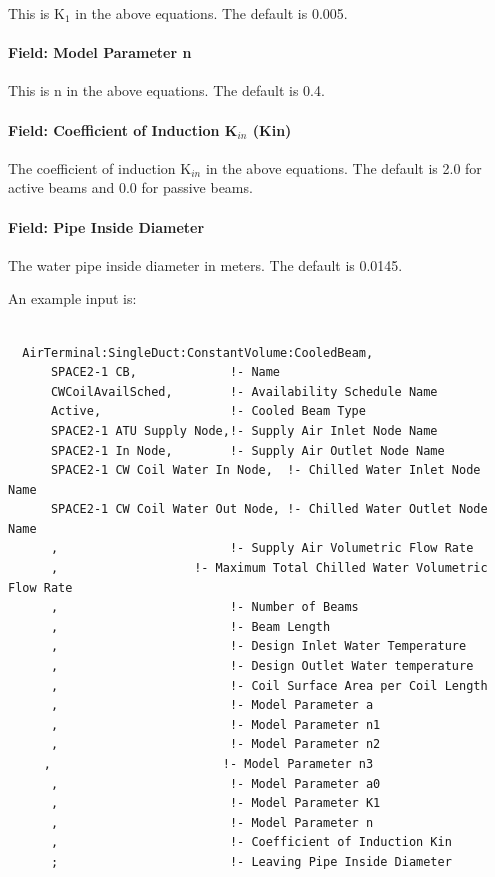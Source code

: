 This is K\(_{1}\) in the above equations. The default is 0.005.

\paragraph{Field: Model Parameter n}\label{field-model-parameter-n}

This is n in the above equations. The default is 0.4.

\paragraph{\texorpdfstring{Field: Coefficient of Induction K\(_{in}\) (Kin)}{Field: Coefficient of Induction K\_\{in\} (Kin)}}\label{field-coefficient-of-induction-kux5fin-kin}

The coefficient of induction K\(_{in}\) in the above equations. The default is 2.0 for active beams and 0.0 for passive beams.

\paragraph{Field: Pipe Inside Diameter}\label{field-pipe-inside-diameter}

The water pipe inside diameter in meters. The default is 0.0145.

An example input is:

\begin{lstlisting}

  AirTerminal:SingleDuct:ConstantVolume:CooledBeam,
      SPACE2-1 CB,             !- Name
      CWCoilAvailSched,        !- Availability Schedule Name
      Active,                  !- Cooled Beam Type
      SPACE2-1 ATU Supply Node,!- Supply Air Inlet Node Name
      SPACE2-1 In Node,        !- Supply Air Outlet Node Name
      SPACE2-1 CW Coil Water In Node,  !- Chilled Water Inlet Node Name
      SPACE2-1 CW Coil Water Out Node, !- Chilled Water Outlet Node Name
      ,                        !- Supply Air Volumetric Flow Rate
      ,                   !- Maximum Total Chilled Water Volumetric Flow Rate
      ,                        !- Number of Beams
      ,                        !- Beam Length
      ,                        !- Design Inlet Water Temperature
      ,                        !- Design Outlet Water temperature
      ,                        !- Coil Surface Area per Coil Length
      ,                        !- Model Parameter a
      ,                        !- Model Parameter n1
      ,                        !- Model Parameter n2
     ,                        !- Model Parameter n3
      ,                        !- Model Parameter a0
      ,                        !- Model Parameter K1
      ,                        !- Model Parameter n
      ,                        !- Coefficient of Induction Kin
      ;                        !- Leaving Pipe Inside Diameter
\end{lstlisting}

